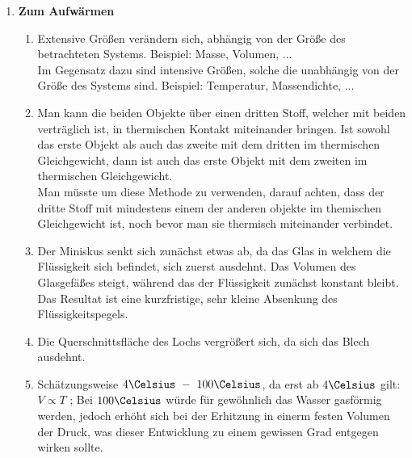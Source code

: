 \documentclass[11pt,letterpaper]{article}
\begin{document}

\begin{enumerate}
    \item \textbf{Zum Aufwärmen}
    \begin{enumerate}
        \item 
            Extensive Größen verändern sich, abhängig von der Größe des betrachteten Systems.
            Beispiel: Masse, Volumen, ...\\[1ex]
            Im Gegensatz dazu sind intensive Größen, solche die unabhängig von der Größe des Systems sind.
            Beispiel: Temperatur, Massendichte, ...
        \item 
            Man kann die beiden Objekte über einen dritten Stoff, 
            welcher mit beiden verträglich ist, 
            in thermischen Kontakt miteinander bringen.
            Ist sowohl das erste Objekt als auch das zweite mit dem dritten im thermischen Gleichgewicht, 
            dann ist auch das erste Objekt mit dem zweiten im thermischen Gleichgewicht. \\
            Man müsste um diese Methode zu verwenden, darauf achten, dass der dritte Stoff mit 
            mindestens einem der anderen objekte im themischen Gleichgewicht ist, noch bevor man 
            sie thermisch miteinander verbindet. 
        \item 
            Der Miniskus senkt sich zunächst etwas ab, da das Glas in welchem die Flüssigkeit
            sich befindet, sich zuerst ausdehnt. Das Volumen des Glasgefäßes steigt, während das
            der Flüssigkeit zunächst konstant bleibt. Das Resultat ist eine kurzfristige, sehr kleine 
            Absenkung des Flüssigkeitspegels.
        \item
            Die Querschnittsfläche des Lochs vergrößert sich, da sich das Blech ausdehnt.
        \item 
            Schätzungsweise $4\Celsius \ -\ 100\Celsius $, da erst ab $4\Celsius$ gilt: $ V \propto T$
            ; Bei $100\Celsius$ würde für gewöhnlich das Wasser gasförmig werden, jedoch erhöht sich bei
            der Erhitzung in einerm festen Volumen der Druck, was dieser Entwicklung zu einem gewissen Grad entgegen wirken sollte.
    \end{enumerate}


\end{enumerate}
\end{document}
